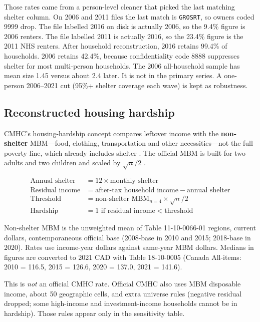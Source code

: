 \documentclass[11pt,letterpaper]{article}
\begin{document}
Those rates came from a person-level cleaner that picked the last matching shelter column.
On 2006 and 2011 files the last match is \texttt{GROSRT}, so owners coded 9999 drop.
The file labelled 2016 on disk is actually 2006, so the 9.4\% figure is 2006 renters.
The file labelled 2011 is actually 2016, so the 23.4\% figure is the 2011 NHS renters.
After household reconstruction, 2016 retains 99.4\% of households.
2006 retains 42.4\%, because confidentiality code 8888 suppresses shelter for most multi-person households.
The 2006 all-household sample has mean size 1.45 versus about 2.4 later.
It is not in the primary series.
A one-person 2006--2021 cut (95\%+ shelter coverage each wave) is kept as robustness.

\subsection{Reconstructed housing hardship}

CMHC's housing-hardship concept compares leftover income with the \textbf{non-shelter} MBM---food, clothing, transportation and other necessities---not the full poverty line, which already includes shelter \cite{cmhc2020}.
The official MBM is built for two adults and two children and scaled by $\sqrt{n}/2$ \cite{statcan2021mbm}.

\begin{align}
\text{Annual shelter} &= 12 \times \text{monthly shelter} \\
\text{Residual income} &= \text{after-tax household income} - \text{annual shelter} \\
\text{Threshold} &= \text{non-shelter MBM}_{n=4} \times \sqrt{n}/2 \\
\text{Hardship} &= 1 \text{ if residual income} < \text{threshold}
\end{align}

Non-shelter MBM is the unweighted mean of Table 11-10-0066-01 regions, current dollars, contemporaneous official base (2008-base in 2010 and 2015; 2018-base in 2020).
Rates use income-year dollars against same-year MBM dollars.
Medians in figures are converted to 2021 CAD with Table 18-10-0005 (Canada All-items: 2010 = 116.5, 2015 = 126.6, 2020 = 137.0, 2021 = 141.6).

This is \emph{not} an official CMHC rate.
Official CMHC also uses MBM disposable income, about 50 geographic cells, and extra universe rules (negative residual dropped; some high-income and investment-income households cannot be in hardship).
Those rules appear only in the sensitivity table.
\end{document}

